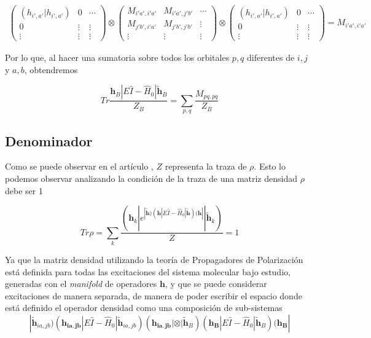 \documentclass[
	12pt, %
]{fphw}
\begin{document}
\begin{eqnarray}
	\begin{pmatrix}
		(h_{i',a'} | h_{i',a'}) & 0 & \cdots \\
		0 & \vdots & \vdots \\
		\vdots & \vdots & \vdots 
	\end{pmatrix} \otimes \begin{pmatrix}
		M_{i'a',i'a'} & M_{i'a',j' b'} &  \cdots \\
		M_{j' b',i'a'} & M_{j' b',j' b'} & \vdots \\
		\vdots & \vdots & \vdots
	\end{pmatrix} \otimes
	\begin{pmatrix}
		(h_{i',a'} | h_{i',a'}) & 0 & \cdots \\
		0 & \vdots & \vdots \\
		\vdots & \vdots & \vdots 
	\end{pmatrix} = M_{i'a',i'a'}
	\end{eqnarray}

Por lo que, al hacer una sumatoria sobre todos los orbitales $p,q$ diferentes de $i,j$ y $a,b$, obtendremos

\begin{equation}
	Tr\frac{\bm{h}_B| E \hat{I} - \hat{H}_0 | \bm{\widetilde{h}}_B }{Z_{B}} =  \sum_{p,q} \frac{M_{pq,pq}}{Z_{B}}
\end{equation}

\subsection*{Denominador}

Como se puede observar en el artículo \cite{Millan}, $Z$ representa la traza de $\rho$. Esto lo podemos observar
analizando la condición de la traza de una matriz densidad $\rho$ debe ser 1 

\begin{equation}
	Tr \rho =  \sum_k \frac{(\bm{h}_k|e^{| \bm{\widetilde{h}} ) (\bm{h}| E \hat{I} - \hat{H}_0 | \bm{\widetilde{h}} )   (\bm{h}|} |\bm{\widetilde{h}}_k) } 
	{Z} = 1
\end{equation}

Ya que la matriz densidad utilizando la teoría de Propagadores de Polarización \cite{QFT} está definida para todas las excitaciones del 
sistema molecular bajo estudio, generadas con el \textit{manifold} de operadores $\bm{h}$, y que se puede considerar
excitaciones de manera separada, de manera de poder escribir el espacio donde está definido el operador densidad 
como una composición de sub-sistemas  
\begin{equation}
	| \bm{\widetilde{h}}_{ia,jb} ) (\bm{h_{ia,jb}}| E \hat{I} - \hat{H}_0 | \bm{\widetilde{h}}_{ia,jb} )   (\bm{h_{ia,jb}}| \otimes
	| \bm{\widetilde{h}}_B ) (\bm{h_B}| E \hat{I} - \hat{H}_0 | \bm{\widetilde{h}}_B )   (\bm{h_B}|
\end{equation}
\end{document}
